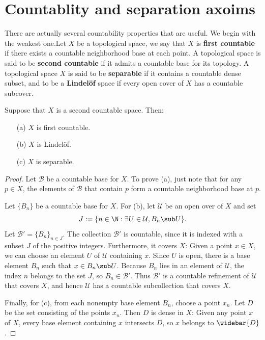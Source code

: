 \section{Countablity and separation axoims}
There are actually several countability properties that are useful. We begin with the weakest one.Let $X$ be a topological space, we say that $X$ is \textbf{first countable} if there exists a countable neighborhood base at each point. A topological space is said to be \textbf{second countable} if it admits a countable base for its topology. A topological space $X$ is said to be \textbf{separable} if it contains a countable dense subset, and to be a \textbf{Lindel\"of} space if every open cover of $X$ has a countable subcover.
\begin{theorem}\label{second countable prop}
Suppose that $X$ is a second countable space. Then:
\begin{itemize}
\item[(a)] $X$ is first countable.
\item[(b)] $X$ is Lindel\"of.
\item[(c)] $X$ is separable.
\end{itemize}
\end{theorem}
\begin{proof}
Let $\mathcal{B}$ be a countable base for $X$. To prove (a), just note that for any $p\in X$, the elements of $\mathcal{B}$ that contain $p$ form a countable neighborhood base at $p$.\par
Let $\{B_n\}$ be a countable base for $X$. For (b), let $\mathcal{U}$ be an open over of $X$ and set
\[J:=\{n\in\N:\exists U\in\mathcal{U}, B_n\sub U\}.\]
Let $\mathcal{B}'=\{B_n\}_{n\in J}$. The collection $\mathcal{B}'$ is countable, since it is indexed with a subset $J$ of the positive integers. Furthermore, it covers $X$: Given a point $x\in X$, we can choose an element $U$ of $\mathcal{U}$ containing $x$. Since $U$ is open, there is a base element $B_n$ such that $x\in B_n\sub U$. Because $B_n$ lies in an element of $\mathcal{U}$, the index $n$ belongs to the set $J$, so $B_n\in\mathcal{B}'$. Thus $\mathcal{B}'$ is a countable refinement of $\mathcal{U}$ that covers $X$, and hence $\mathcal{U}$ has a countable subcollection that covers $X$.\par
Finally, for (c), from each nonempty base element $B_n$, choose a point $x_n$. Let $D$ be the set consisting of the points $x_n$. Then $D$ is dense in $X$: Given any point $x$ of $X$, every base element containing $x$ intersects $D$, so $x$ belongs to $\widebar{D}$.
\end{proof}

